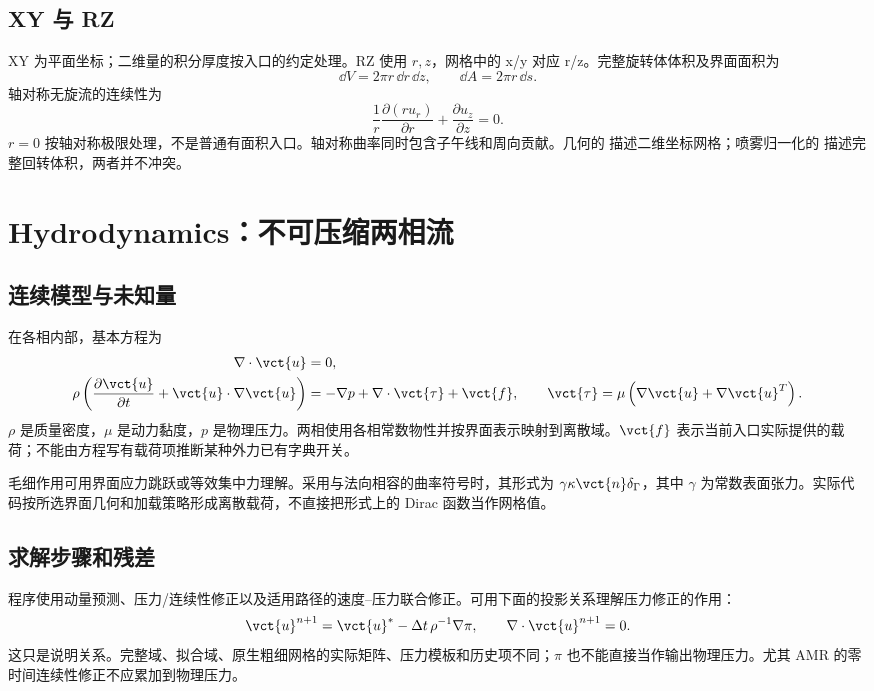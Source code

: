 \documentclass[a4paper,11pt]{article}
\begin{document}
\subsection{XY 与 RZ}
XY 为平面坐标；二维量的积分厚度按入口的约定处理。RZ 使用 $r,z$，网格中的 x/y 对应 r/z。完整旋转体体积及界面面积为
\begin{equation}
\dd V=2\pi r\,\dd r\,\dd z,\qquad \dd A=2\pi r\,\dd s.
\end{equation}
轴对称无旋流的连续性为
\begin{equation}
\frac{1}{r}\frac{\partial(ru_r)}{\partial r}+\frac{\partial u_z}{\partial z}=0.
\end{equation}
$r=0$ 按轴对称极限处理，不是普通有面积入口。轴对称曲率同时包含子午线和周向贡献。几何的  描述二维坐标网格；喷雾归一化的  描述完整回转体积，两者并不冲突。

\section{Hydrodynamics：不可压缩两相流}
\subsection{连续模型与未知量}
在各相内部，基本方程为
\begin{align}
\nabla\cdot\vct{u}&=0,\\
\rho\left(\frac{\partial\vct{u}}{\partial t}+\vct{u}\cdot\nabla\vct{u}\right)
&=-\nabla p+\nabla\cdot\vct{\tau}+\vct{f},
\qquad \vct{\tau}=\mu\left(\nabla\vct{u}+\nabla\vct{u}^{T}\right).
\end{align}
$\rho$ 是质量密度，$\mu$ 是动力黏度，$p$ 是物理压力。两相使用各相常数物性并按界面表示映射到离散域。$\vct{f}$ 表示当前入口实际提供的载荷；不能由方程写有载荷项推断某种外力已有字典开关。

毛细作用可用界面应力跳跃或等效集中力理解。采用与法向相容的曲率符号时，其形式为 $\gamma\kappa\vct{n}\delta_\Gamma$，其中 $\gamma$ 为常数表面张力。实际代码按所选界面几何和加载策略形成离散载荷，不直接把形式上的 Dirac 函数当作网格值。

\subsection{求解步骤和残差}
程序使用动量预测、压力/连续性修正以及适用路径的速度--压力联合修正。可用下面的投影关系理解压力修正的作用：
\begin{equation}
\vct{u}^{n+1}=\vct{u}^{*}-\Delta t\,\rho^{-1}\nabla\pi,
\qquad \nabla\cdot\vct{u}^{n+1}=0.
\end{equation}
这只是说明关系。完整域、拟合域、原生粗细网格的实际矩阵、压力模板和历史项不同；$\pi$ 也不能直接当作输出物理压力。尤其 AMR 的零时间连续性修正不应累加到物理压力。
\end{document}
